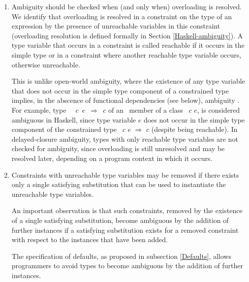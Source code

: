 \documentclass[review]{elsarticle}
\begin{document}
 \begin{enumerate}
  \item Ambiguity should be checked when (and only when) overloading
    is resolved.  We identify that overloading is resolved in a
    constraint on the type of an expression by the presence of
    unreachable variables in this constraint (overloading resolution
    is defined formally in Section \ref{Haskell-ambiguity}). A type
    variable that occurs in a constraint is called reachable if it
    occurs in the simple type or in a constraint where another
    reachable type variable occurs, otherwise unreachable.

    This is unlike open-world ambiguity, where the existence of any
    type variable that does not occur in the simple type component of
    a constrained type implies, in the abscence of functional
    dependencies (see below), ambiguity . For example, type {\tt
      \Coll\ $c$ $e$ $\Rightarrow$ $c$} of an \mempty\ member of a
    class \Coll\ $c$ $e$, is considered ambiguous in Haskell, since
    type variable $e$ does not occur in the simple type component of
    the constrained type \Coll\ $c$ $e$ $\Rightarrow$ $c$ (despite
    being reachable). In delayed-closure ambiguity, types with only
    reachable type variables are not checked for ambiguity, since
    overloading is still unresolved and may be resolved later,
    depending on a program context in which it occurs.

  \item Constraints with unreachable type variables may be removed if
    there exists only a single satisfying substitution that can be
    used to instantiate the unreachable type variables.

    An important observation is that such constraints, removed by the
    existence of a single satisfying substitution, become ambiguous by
    the addition of further instances if a satisfying substitution
    exists for a removed constraint with respect to the instances that
    have been added.

    The specification of defaults, as proposed in subsection
    \ref{Defaults}, allows programmers to avoid types to become
    ambiguous by the addition of further instances.


  \end{enumerate}
\end{document}
